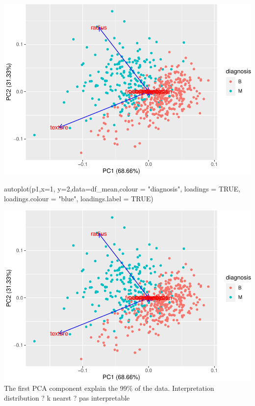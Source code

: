 \documentclass[
  11pt,
]{article}
\newenvironment{Shaded}{\begin{snugshade}}{\end{snugshade}}
\newcommand{\AttributeTok}[1]{\textcolor[rgb]{0.77,0.63,0.00}{#1}}
\newcommand{\ConstantTok}[1]{\textcolor[rgb]{0.00,0.00,0.00}{#1}}
\newcommand{\DecValTok}[1]{\textcolor[rgb]{0.00,0.00,0.81}{#1}}
\newcommand{\FunctionTok}[1]{\textcolor[rgb]{0.00,0.00,0.00}{#1}}
\newcommand{\NormalTok}[1]{#1}
\newcommand{\StringTok}[1]{\textcolor[rgb]{0.31,0.60,0.02}{#1}}
\begin{document}
\includegraphics{stat_DAP_files/figure-latex/unnamed-chunk-19-1.pdf}

\begin{Shaded}
\begin{Highlighting}[]
\FunctionTok{autoplot}\NormalTok{(p1,}\AttributeTok{x=}\DecValTok{1}\NormalTok{, }\AttributeTok{y=}\DecValTok{2}\NormalTok{,}\AttributeTok{data=}\NormalTok{df\_mean,}\AttributeTok{colour =} \StringTok{"diagnosis"}\NormalTok{, }\AttributeTok{loadings =} \ConstantTok{TRUE}\NormalTok{, }\AttributeTok{loadings.colour =} \StringTok{"blue"}\NormalTok{,}
         \AttributeTok{loadings.label =} \ConstantTok{TRUE}\NormalTok{)}
\end{Highlighting}
\end{Shaded}

\includegraphics{stat_DAP_files/figure-latex/unnamed-chunk-19-2.pdf} The
first PCA component explain the 99\% of the data. Interpretation
distribution ? k nearst ? pas interpretable
\end{document}
